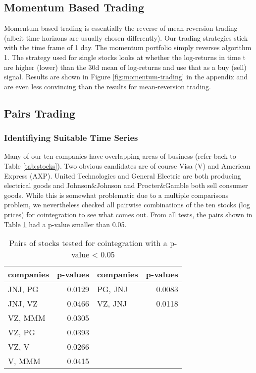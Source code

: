 \subsection{Momentum Based Trading}
Momentum based trading is essentially the reverse of mean-reversion trading (albeit time horizons are usually chosen differently). Our trading strategies stick with the time frame of 1 day. The momentum portfolio simply reverses algorithm 1. The strategy used for single stocks looks at whether the log-returns in time t are higher (lower) than the 30d mean of log-returns and use that as a buy (sell) signal. Results are shown in Figure \ref{fig:momentum-trading} in the appendix and are even less convincing than the results for mean-reversion trading. 

\subsection{Pairs Trading}
\subsubsection{Identifiying Suitable Time Series}
Many of our ten companies have overlapping areas of business (refer back to Table \ref{tab:stocks}). Two obvious candidates are of course Visa (V) and American Express (AXP). United Technologies and General Electric are both producing electrical goods and Johnson\&Johnson and Procter\&Gamble both sell consumer goods. While this is somewhat problematic due to a multiple comparisons problem, we nevertheless checked all pairwise combinations of the ten stocks (log prices) for cointegration to see what comes out. From all tests, the pairs shown in Table \ref{tab:coint} had a p-value smaller than 0.05.

\begin{table}[h!]
    \centering
\small
\begin{tabular}{lrlr}
\toprule
companies &   p-values & companies & p-values \\
\midrule
JNJ, PG & 0.0129 & PG, JNJ & 0.0083  \\
\vspace{1ex}
JNJ, VZ & 0.0466 & VZ, JNJ & 0.0118 \\
\vspace{0.2ex}
VZ, MMM & 0.0305 & & \\
\vspace{0.2ex}
VZ, PG & 0.0393 & & \\
\vspace{0.2ex}
VZ, V & 0.0266  & & \\
\vspace{0.2ex}
V, MMM & 0.0415 & & \\
\bottomrule
\end{tabular}
    \caption{Pairs of stocks tested for cointegration with a p-value < 0.05}
    \label{tab:coint}
\end{table}


